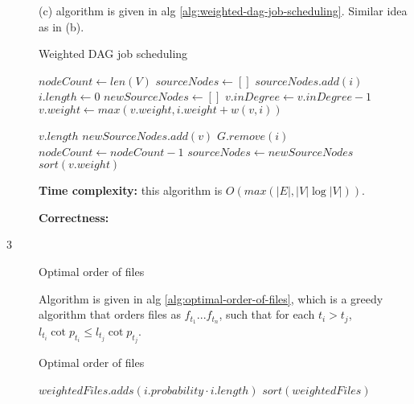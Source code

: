\documentclass{article}
\begin{document}
\begin{description}
  (c) algorithm is given in alg \ref{alg:weighted-dag-job-scheduling}. Similar idea as in (b). 

  \begin{algorithm}[h]
  \caption{Weighted DAG job scheduling}
  \label{alg:weighted-dag-job-scheduling}
    \begin{algorithmic}[1]
  
      \State $nodeCount \gets len(V)$
      \State $sourceNodes \gets []$
          \State $sourceNodes.add(i)$
          \State $i.length \gets 0$
        \EndIf
      \EndFor
        \State $newSourceNodes \gets []$
            \State $v.inDegree \gets v.inDegree - 1$
            \State $v.weight \gets max(v.weight, i.weight + w(v,i))$
            
            \State $v.length$
              \State $newSourceNodes.add(v)$
            \EndIf
          \EndFor
          \State $G.remove(i)$
          \State $nodeCount \gets nodeCount - 1$
        \EndFor
        \State $sourceNodes \gets newSourceNodes$
      \EndWhile
      \State \Return $sort(v.weight)$
    \EndFunction
    
    \end{algorithmic}
  \end{algorithm}

  \textbf{Time complexity:} this algorithm is $O(max(|E|, |V| \log |V|))$.

  \textbf{Correctness:} 

\item[3]{Optimal order of files}
  
  Algorithm is given in alg \ref{alg:optimal-order-of-files}, which is a greedy algorithm that orders files as $f_{t_1}...f_{t_n}$, such that for each $t_i > t_j$, $l_{t_i} \cot p_{t_i} \leq l_{t_j} \cot p_{t_j}$.

  \begin{algorithm}[h]
  \caption{Optimal order of files}
  \label{alg:optimal-order-of-files}
    \begin{algorithmic}[1]
  
        \State $weightedFiles.adds(i.probability \cdot i.length)$
      \EndFor
      \State \Return $sort(weightedFiles)$
    \EndFunction
    
    \end{algorithmic}
  \end{algorithm}


\end{description}
\end{document}
